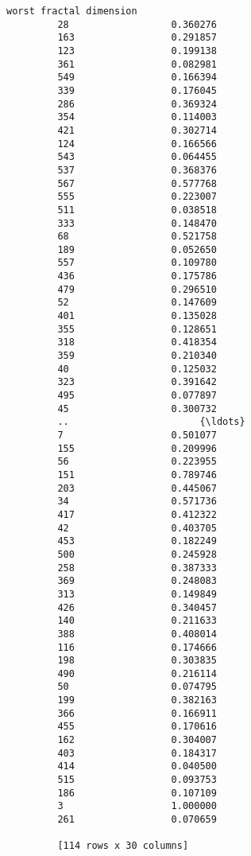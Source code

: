\documentclass[11pt]{article}
\begin{document}
\begin{Verbatim}[commandchars=\\\{\}]
              worst fractal dimension  
         28                  0.360276  
         163                 0.291857  
         123                 0.199138  
         361                 0.082981  
         549                 0.166394  
         339                 0.176045  
         286                 0.369324  
         354                 0.114003  
         421                 0.302714  
         124                 0.166566  
         543                 0.064455  
         537                 0.368376  
         567                 0.577768  
         555                 0.223007  
         511                 0.038518  
         333                 0.148470  
         68                  0.521758  
         189                 0.052650  
         557                 0.109780  
         436                 0.175786  
         479                 0.296510  
         52                  0.147609  
         401                 0.135028  
         355                 0.128651  
         318                 0.418354  
         359                 0.210340  
         40                  0.125032  
         323                 0.391642  
         495                 0.077897  
         45                  0.300732  
         ..                       {\ldots}  
         7                   0.501077  
         155                 0.209996  
         56                  0.223955  
         151                 0.789746  
         203                 0.445067  
         34                  0.571736  
         417                 0.412322  
         42                  0.403705  
         453                 0.182249  
         500                 0.245928  
         258                 0.387333  
         369                 0.248083  
         313                 0.149849  
         426                 0.340457  
         140                 0.211633  
         388                 0.408014  
         116                 0.174666  
         198                 0.303835  
         490                 0.216114  
         50                  0.074795  
         199                 0.382163  
         366                 0.166911  
         455                 0.170616  
         162                 0.304007  
         403                 0.184317  
         414                 0.040500  
         515                 0.093753  
         186                 0.107109  
         3                   1.000000  
         261                 0.070659  
         
         [114 rows x 30 columns]
\end{Verbatim}
            
\end{document}
